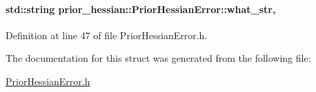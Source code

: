 \paragraph[{\texorpdfstring{what\+\_\+str}{what_str}}]{\setlength{\rightskip}{0pt plus 5cm}std\+::string prior\+\_\+hessian\+::\+Prior\+Hessian\+Error\+::what\+\_\+str\hspace{0.3cm}{\ttfamily [protected]}, {\ttfamily [inherited]}}\hypertarget{classprior__hessian_1_1PriorHessianError_a0d97e1b6b1bcf6a440400706f416375e}{}\label{classprior__hessian_1_1PriorHessianError_a0d97e1b6b1bcf6a440400706f416375e}


Definition at line 47 of file Prior\+Hessian\+Error.\+h.



The documentation for this struct was generated from the following file\+:\begin{DoxyCompactItemize}
\item 
\hyperlink{PriorHessianError_8h}{Prior\+Hessian\+Error.\+h}\end{DoxyCompactItemize}

